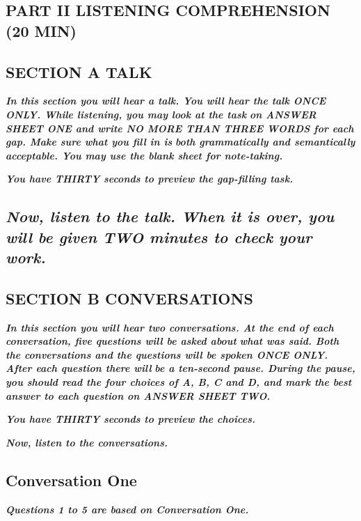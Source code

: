 \documentclass[UTF8,11pt]{ctexart}
\begin{document}
\subsection*{\textbf{PART II} \textbf{LISTENING COMPREHENSION (20 MIN})}


\subsection*{\textbf{SECTION A TALK}}


\textbf{\textit{In this section you will hear a talk. You will hear the talk ONCE ONLY. While listening, you may look at the task}} \textbf{\textit{on ANSWER SHEET ONE and write NO MORE THAN THREE WORDS for each gap. Make sure what you fill in is}} \textbf{\textit{both grammatically and semantically acceptable. You may use the blank sheet for note-taking.}}


\textbf{\textit{You have THIRTY seconds to preview the gap-filling task.}}


\subsection*{\textbf{\textit{Now, listen to the talk. When it is over, you will be given TWO minutes to check your work.}}}


\subsection*{\textbf{SECTION B CONVERSATIONS}}


\textbf{\textit{In this section you will hear two conversations. At the end of each conversation, five questions will be asked about}} \textbf{\textit{what was said. Both the conversations and the questions will be spoken ONCE ONLY. After each question there will}} \textbf{\textit{be a ten-second pause. During the pause, you should read the four choices of A, B, C and D, and mark the best}} \textbf{\textit{answer to each question on ANSWER SHEET TWO.}}


\textbf{\textit{You have THIRTY seconds to preview the choices.}}


\textbf{\textit{Now, listen to the conversations.}}


\subsection*{\textbf{Conversation One}}


\textbf{\textit{Questions 1 to 5 are based on Conversation One.}}
\end{document}
